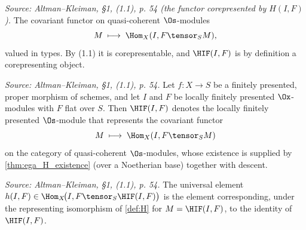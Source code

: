 \begin{definition}
  \label{def:homTensorFunctor}
  \textit{Source: Altman--Kleiman, §1, (1.1), p. 54 (the functor corepresented by $H(I,F)$).}
  The covariant functor on quasi-coherent $\Os$-modules
  \[
    M \;\longmapsto\; \Hom_X(I, F \tensor_S M),
  \]
  valued in types. By (1.1) it is corepresentable, and $\HIF(I,F)$ is by
  definition a corepresenting object.
\end{definition}


\begin{definition}
  \label{def:H}
  \textit{Source: Altman--Kleiman, §1, (1.1), p. 54.}
  Let $f : X \to S$ be a finitely presented, proper morphism of schemes, and let
  $I$ and $F$ be locally finitely presented $\Ox$-modules with $F$ flat over $S$.
  Then $\HIF(I,F)$ denotes the locally finitely presented $\Os$-module that
  represents the covariant functor
  \[
    M \;\longmapsto\; \Hom_X(I, F \tensor_S M)
  \]
  on the category of quasi-coherent $\Os$-modules, whose existence is supplied by
  \cref{thm:ega_H_existence} (over a Noetherian base) together with descent.
\end{definition}

\begin{definition}
  \label{def:h}
  \textit{Source: Altman--Kleiman, §1, (1.1), p. 54.}
  The universal element $h(I,F) \in \Hom_X\!\big(I, F \tensor_S \HIF(I,F)\big)$ is
  the element corresponding, under the representing isomorphism of \cref{def:H}
  for $M = \HIF(I,F)$, to the identity of $\HIF(I,F)$.
\end{definition}

